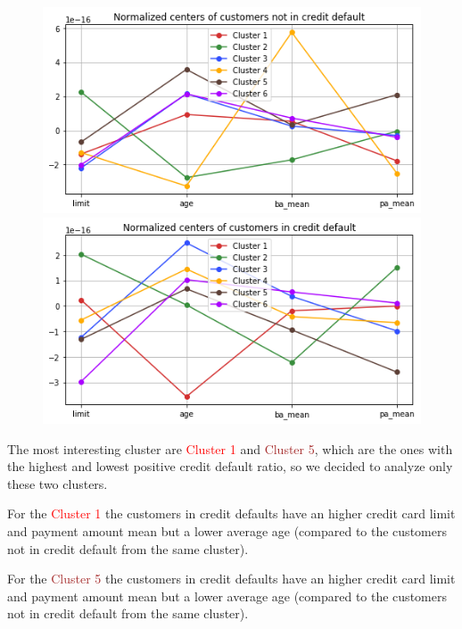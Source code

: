 \begin{figure}[h]
  \begin{minipage}[h]{.50\textwidth}
    \includegraphics[width=1\textwidth]{img/ch3/kmeans_par_default_no}
  \end{minipage}
  \begin{minipage}[h]{.50\textwidth}    
    \includegraphics[width=1\textwidth]{img/ch3/kmeans_par_default_yes}
  \end{minipage}
\end{figure}

The most interesting cluster are \textcolor{red}{Cluster 1} and \textcolor{brown}{Cluster 5}, which are the ones with the highest and lowest positive credit default ratio, so we decided to analyze only these two clusters.

\medskip

For the \textcolor{red}{Cluster 1} the customers in credit defaults have an higher credit card limit and payment amount mean but a lower average age (compared to the customers not in credit default from the same cluster).

\medskip

For the \textcolor{brown}{Cluster 5} the customers in credit defaults have an higher credit card limit and payment amount mean but a lower average age (compared to the customers not in credit default from the same cluster).

